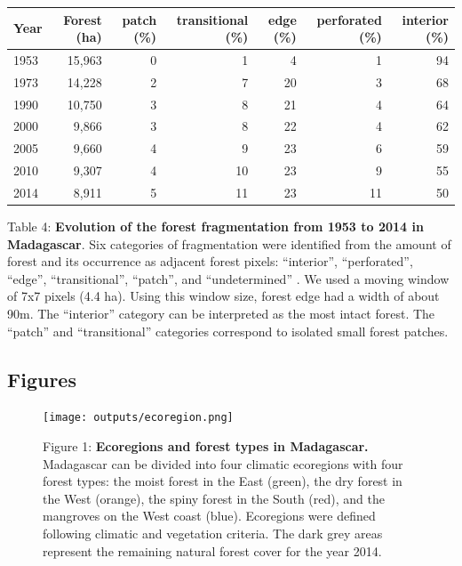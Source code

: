 \documentclass[]{article}
\begin{document}
\begin{longtable}[]{@{}lrrrrrr@{}}
\toprule
Year & Forest (ha) & patch (\%) & transitional (\%) & edge (\%) &
perforated (\%) & interior (\%)\tabularnewline
\midrule
\endhead
1953 & 15,963 & 0 & 1 & 4 & 1 & 94\tabularnewline
1973 & 14,228 & 2 & 7 & 20 & 3 & 68\tabularnewline
1990 & 10,750 & 3 & 8 & 21 & 4 & 64\tabularnewline
2000 & 9,866 & 3 & 8 & 22 & 4 & 62\tabularnewline
2005 & 9,660 & 4 & 9 & 23 & 6 & 59\tabularnewline
2010 & 9,307 & 4 & 10 & 23 & 9 & 55\tabularnewline
2014 & 8,911 & 5 & 11 & 23 & 11 & 50\tabularnewline
\bottomrule
\end{longtable}

Table 4: \textbf{Evolution of the forest fragmentation from 1953 to 2014
in Madagascar}. Six categories of fragmentation were identified from the
amount of forest and its occurrence as adjacent forest pixels:
``interior'', ``perforated'', ``edge'', ``transitional'', ``patch'', and
``undetermined'' \citep{Riitters2000}. We used a moving window of 7x7
pixels (4.4 ha). Using this window size, forest edge had a width of
about 90m. The ``interior'' category can be interpreted as the most
intact forest. The ``patch'' and ``transitional'' categories correspond
to isolated small forest patches.

\hypertarget{figures}{%
\subsection{Figures}\label{figures}}

\begin{figure}
\centering
\texttt{[image: outputs/ecoregion.png]}
\caption{Figure 1: \textbf{Ecoregions and forest types in Madagascar.}
Madagascar can be divided into four climatic ecoregions with four forest
types: the moist forest in the East (green), the dry forest in the West
(orange), the spiny forest in the South (red), and the mangroves on the
West coast (blue). Ecoregions were defined following climatic
\citep{Cornet1974} and vegetation \citep{IEFN1996} criteria. The dark
grey areas represent the remaining natural forest cover for the year
2014.}
\end{figure}
\end{document}
